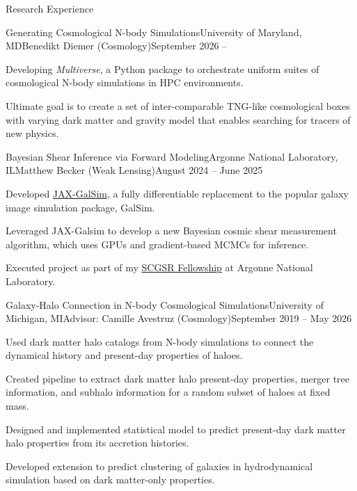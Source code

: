 \documentclass{resume} %
\begin{document}

\begin{rSection}{Research Experience}

\begin{rSubsection}{Generating Cosmological N-body Simulations}{University of Maryland, MD}{Benedikt Diemer (Cosmology)}{September 2026 --}
\item Developing \textit{Multiverse}, a Python package to orchestrate uniform suites of cosmological N-body simulations in HPC environments.
\item Ultimate goal is to create a set of inter-comparable TNG-like cosmological boxes with varying dark matter and gravity model that enables searching for tracers of new physics.
\end{rSubsection}

\begin{rSubsection}{Bayesian Shear Inference via Forward Modeling}{Argonne National Laboratory, IL}{Matthew Becker (Weak Lensing)}{August 2024 -- June 2025}
\item Developed \href{https://github.com/GalSim-developers/JAX-GalSim}{JAX-GalSim}, a fully differentiable replacement to the popular galaxy image simulation package, GalSim. 
\item Leveraged JAX-Galsim to develop a new Bayesian cosmic shear measurement algorithm, which uses GPUs and gradient-based MCMCs for inference.
\item Executed project as part of my \href{https://science.osti.gov/wdts/scgsr}{SCGSR Fellowship} at Argonne National Laboratory.
\end{rSubsection}

\begin{rSubsection}{Galaxy-Halo Connection in N-body Cosmological Simulations}{University of Michigan, MI}{Advisor: Camille Avestruz (Cosmology)}{September 2019 -- May 2026}
\item Used dark matter halo catalogs from N-body simulations to connect the dynamical history and present-day properties of haloes.
\item Created pipeline to extract dark matter halo present-day properties, merger tree information, and subhalo information for a random subset of haloes at fixed mass.
\item Designed and implemented statistical model to predict present-day dark matter halo properties from its accretion histories.
\item Developed extension to predict clustering of galaxies in hydrodynamical simulation based on dark matter-only properties. 
\end{rSubsection}


\end{rSection}
\end{document}
